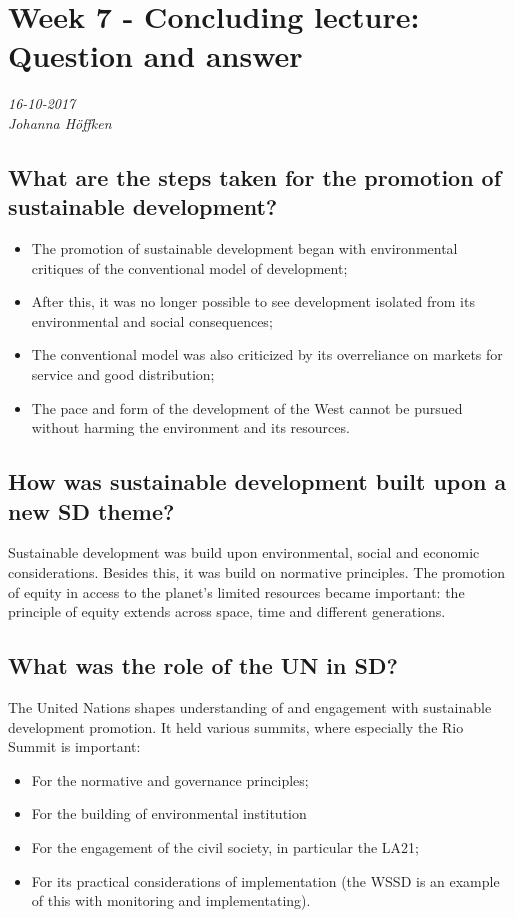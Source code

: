 \chapter{Week 7 - Concluding lecture: Question and answer}
\textit{16-10-2017 \\
Johanna Höffken}

\section{What are the steps taken for the promotion of sustainable development?}

\begin{itemize}
\item The promotion of sustainable development began with environmental critiques of the conventional model of development;
\item After this, it was no longer possible to see development isolated from its environmental and social consequences;
\item The conventional model was also criticized by its overreliance on markets for service and good distribution;
\item The pace and form of the development of the West cannot be pursued without harming the environment and its resources.
\end{itemize}

\section{How was sustainable development built upon a new SD theme?}

Sustainable development was build upon environmental, social and economic considerations. Besides this, it was build on normative principles. The promotion of equity in access to the planet's limited resources became important: the principle of equity extends across space, time and different generations. 

\section{What was the role of the UN in SD?}

The United Nations shapes understanding of and engagement with sustainable development promotion. It held various summits, where especially the Rio Summit is important:
\begin{itemize}
\item For the normative and governance principles;
\item For the building of environmental institution
\item For the engagement of the civil society, in particular the LA21; 
\item For its practical considerations of implementation (the WSSD is an example of this with monitoring and implementating).
\end{itemize}

